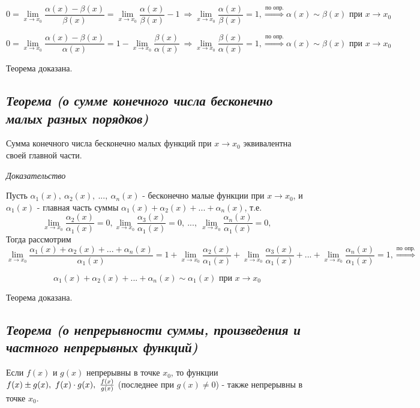 $$0 = \lim\limits_{x \to x_0}{\frac{\alpha(x) - \beta(x)}{\beta(x)}} = \lim\limits_{x \to x_0}{\frac{\alpha(x)}{\beta(x)}} - 1 \ \Rightarrow \lim\limits_{x \to x_0}{\frac{\alpha(x)}{\beta(x)}} = 1, \overset{\text{по опр.}}\Rightarrow \alpha(x) \sim \beta(x) \text{ при } x \rightarrow x_0$$

$$0 = \lim\limits_{x \to x_0}{\frac{\alpha(x) - \beta(x)}{\alpha(x)}} = 1 - \lim\limits_{x \to x_0}{\frac{\beta(x)}{\alpha(x)}} \ \Rightarrow \lim\limits_{x \to x_0}{\frac{\beta(x)}{\alpha(x)}} = 1, \overset{\text{по опр.}}\Rightarrow \alpha(x) \sim \beta(x) \text{ при } x \rightarrow x_0$$

Теорема доказана.
\newpage 
\subsection{\textit{Теорема (о сумме конечного числа бесконечно малых разных порядков)}}

Сумма конечного числа бесконечно малых функций при $x \rightarrow x_0$ эквивалентна своей главной части.

\textit{Доказательство}

Пусть $\alpha_1(x), \ \alpha_2(x), \ ..., \ \alpha_n(x)$ - бесконечно малые функции при $x \rightarrow x_0$, и $\alpha_1(x)$ - главная часть суммы $\alpha_1(x) + \alpha_2(x) + ... +  \alpha_n(x)$, т.е. $$\lim\limits_{x \to x_0}\frac{\alpha_2(x)}{\alpha_1(x)} = 0, \lim\limits_{x \to x_0}\frac{\alpha_3(x)}{\alpha_1(x)} = 0, \ ...,\ \lim\limits_{x \to x_0}\frac{\alpha_n(x)}{\alpha_1(x)} = 0, $$ Тогда рассмотрим $$\lim\limits_{x \to x_0}{\frac{\alpha_1(x) + \alpha_2(x) + ... +  \alpha_n(x)}{\alpha_1(x)}}= 1 + \lim\limits_{x \to x_0}\frac{\alpha_2(x)}{\alpha_1(x)} + \lim\limits_{x \to x_0}\frac{\alpha_3(x)}{\alpha_1(x)}+ ... + \lim\limits_{x \to x_0}\frac{\alpha_n(x)}{\alpha_1(x)} = 1, \overset{\text{по опр.}}\Rightarrow$$

$$ \alpha_1(x) + \alpha_2(x) + ... +  \alpha_n(x) \sim \alpha_1(x) \text{ при } x \rightarrow x_0$$

Теорема доказана.
\newpage 
\subsection{\textit{Теорема (о непрерывности суммы, произведения и частного непрерывных функций)}}

Если $f(x)$ и $g(x)$ непрерывны в точке $x_0$, то функции $f(x) \pm g(x),\ f(x)\cdot g(x), \ {\Large\frac{f(x)}{g(x)}}$ (последнее при $g(x) \neq 0$) - также непрерывны в точке $x_0$.

